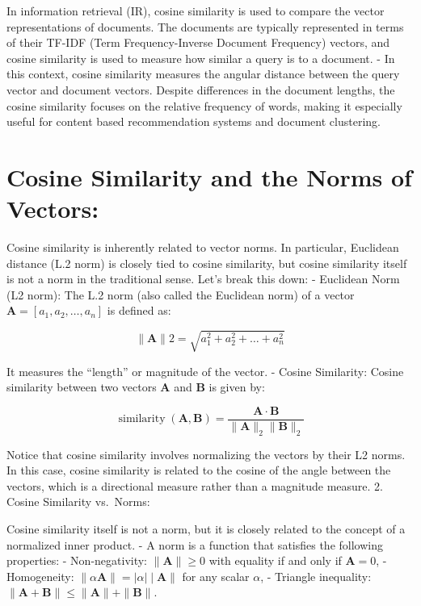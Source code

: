 \documentclass[
  12 pt,
  a4paper,
]{book}
\numberwithin{equation}{section}
\theoremstyle{plain}      %
\theoremstyle{definition} %
\theoremstyle{remark}     %
\theoremstyle{note}         %
\begin{document}
In information retrieval (IR), cosine similarity is used to compare the
vector representations of documents. The documents are typically
represented in terms of their TF-IDF (Term Frequency-Inverse Document
Frequency) vectors, and cosine similarity is used to measure how similar
a query is to a document. - In this context, cosine similarity measures
the angular distance between the query vector and document vectors.
Despite differences in the document lengths, the cosine similarity
focuses on the relative frequency of words, making it especially useful
for content based recommendation systems and document clustering.

\hypertarget{cosine-similarity-and-the-norms-of-vectors}{%
\section{Cosine Similarity and the Norms of
Vectors:}\label{cosine-similarity-and-the-norms-of-vectors}}

Cosine similarity is inherently related to vector norms. In particular,
Euclidean distance (L.2 norm) is closely tied to cosine similarity, but
cosine similarity itself is not a norm in the traditional sense. Let's
break this down: - Euclidean Norm (L2 norm): The L.2 norm (also called
the Euclidean norm) of a vector
\(\mathbf{A}=\left[a_1, a_2, \ldots, a_n\right]\) is defined as:

\[
\|\mathbf{A}\| 2=\sqrt{a_1^2+a_2^2+\ldots+a_n^2}
\]

It measures the ``length'' or magnitude of the vector. - Cosine
Similarity: Cosine similarity between two vectors \(\mathbf{A}\) and
\(\mathbf{B}\) is given by:

\[
\operatorname{similarity}(\mathbf{A}, \mathbf{B})=\frac{\mathbf{A} \cdot \mathbf{B}}{\|\mathbf{A}\|_2\|\mathbf{B}\|_2}
\]

Notice that cosine similarity involves normalizing the vectors by their
L2 norms. In this case, cosine similarity is related to the cosine of
the angle between the vectors, which is a directional measure rather
than a magnitude measure. 2. Cosine Similarity vs.~Norms:

Cosine similarity itself is not a norm, but it is closely related to the
concept of a normalized inner product. - A norm is a function that
satisfies the following properties: - Non-negativity:
\(\|\mathbf{A}\| \geq 0\) with equality if and only if \(\mathbf{A}=0\),
- Homogeneity: \(\|\alpha \mathbf{A}\|=|\alpha| \mid \mathbf{A} \|\) for
any scalar \(\alpha\), - Triangle inequality:
\(\|\mathbf{A}+\mathbf{B}\| \leq\|\mathbf{A}\|+\|\mathbf{B}\|\).
\end{document}
